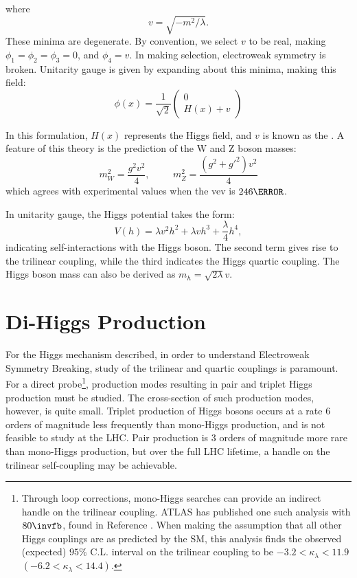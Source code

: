 %
where 
\begin{equation}
    v = \sqrt{-m^2 / \lambda}.
\end{equation}
%
These minima are degenerate. By convention, we select $v$ to be real, making $\phi_1 = \phi_2 = \phi_3 = 0$, and $\phi_4 = v$.  In making selection, electroweak symmetry is broken. Unitarity gauge is given by expanding about this minima, making this field:
\begin{equation}
    \phi(x) = \frac{1}{\sqrt{2}} \begin{pmatrix} 0\\ H(x)+v \end{pmatrix}
\end{equation}

%
In this formulation, $H(x)$ represents the Higgs field, and $v$ is known as the . A feature of this theory is the prediction of the W and Z boson masses:
%
\begin{equation}
    m^2_W = \frac{g^2 v^2}{4}, \hspace{1cm} m^2_Z = \frac{(g^2 +g'^2)v^2}{4}
\end{equation}
%
which agrees with experimental values when the \gls{vev} is $\unit{246}{\GeV}$.

In unitarity gauge, the Higgs potential takes the form:
\begin{equation}
    V(h) = \lambda v^2 h^2 + \lambda v h^3 + \frac{\lambda}{4}h^4,
\end{equation}
%
indicating self-interactions with the Higgs boson. The second term gives rise to the trilinear coupling, while the third indicates the Higgs quartic coupling. The Higgs boson mass can also be derived as $m_h = \sqrt{2\lambda}v$. 


\section{Di-Higgs Production}

For the Higgs mechanism described, in order to understand Electroweak Symmetry Breaking, study of the trilinear and quartic couplings is paramount. For a direct probe\footnote{Through loop corrections, mono-Higgs searches can provide an indirect handle on the trilinear coupling. ATLAS has published one such analysis with $\unit{80}{\invfb}$, found in Reference \cite{monohiggs-selfcoupling}. When making the assumption that all other Higgs couplings are as predicted by the \gls{SM}, this analysis finds the observed (expected) $95\%$ C.L. interval on the trilinear coupling to be $-3.2 < \kappa_\lambda <11.9$   $(-6.2 < \kappa_\lambda <14.4)$. }, production modes resulting in pair and triplet Higgs production must be studied. The cross-section of such production modes, however, is quite small. Triplet production of Higgs bosons occurs at a rate 6 orders of magnitude less frequently than mono-Higgs production, and is not feasible to study at the \gls{LHC}. Pair production is 3 orders of magnitude more rare than mono-Higgs production, but over the full \gls{LHC} lifetime, a handle on the trilinear self-coupling may be achievable.

